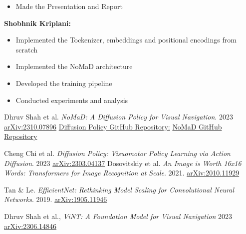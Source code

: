 \documentclass[12pt]{article}
\begin{document}
\begin{appendices}
\begin{itemize}
        \item Made the Presentation and Report
    \end{itemize}
    \textbf{Shobhnik Kriplani:} \\
    \begin{itemize}
        \item Implemented the Tockenizer, embeddings and positional encodings from scratch
        \item Implemented the NoMaD architecture
        \item Developed the training pipeline
        \item Conducted experiments and analysis
    \end{itemize}
\newpage
\begin{thebibliography}{9}
\label{references}
Dhruv Shah et al.
\textit{NoMaD: A Diffusion Policy for Visual Navigation}.
2023
\href{https://arxiv.org/abs/2310.07896}{arXiv:2310.07896}
\href{https://github.com/wayveai/diffusion-policy}{Diffusion Policy GitHub Repository:}
\href{https://github.com/robodhruv/visualnav-transformer}{NoMaD GitHub Repository}

Cheng Chi et al.
\textit{Diffusion Policy: Visuomotor Policy Learning via Action Diffusion}.
2023
\href{https://arxiv.org/abs/2303.04137}{arXiv:2303.04137}
Dosovitskiy et al. 
\textit{An Image is Worth 16x16 Words: Transformers for Image Recognition at Scale}. 
2021. 
\href{https://arxiv.org/abs/2010.11929}{arXiv:2010.11929}

Tan \& Le. 
\textit{EfficientNet: Rethinking Model Scaling for Convolutional Neural Networks}. 
2019. 
\href{https://arxiv.org/abs/1905.11946}{arXiv:1905.11946}

Dhruv Shah et al.,
\textit{ViNT: A Foundation Model for Visual Navigation} 2023
\href{https://arxiv.org/abs/2306.14846}{arXiv:2306.14846}
\end{thebibliography}
\end{appendices}
\end{document}
